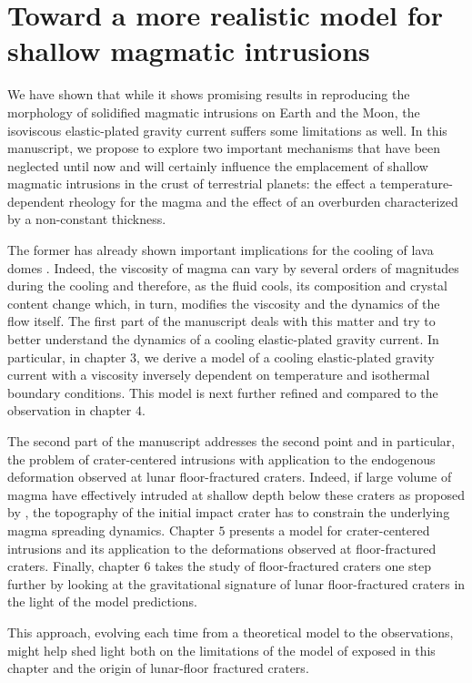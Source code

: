 \section{Toward   a  more   realistic  model   for  shallow   magmatic
  intrusions}
\label{C2-sec:discussion}

We have shown that while it shows promising results in reproducing the
morphology of  solidified magmatic intrusions  on Earth and  the Moon,
the isoviscous elastic-plated gravity current suffers some limitations
as  well.  In  this manuscript,  we propose  to explore  two important
mechanisms  that have  been  neglected until  now  and will  certainly
influence the emplacement of shallow  magmatic intrusions in the crust
of terrestrial  planets: the  effect a  temperature-dependent rheology
for  the magma  and the  effect of  an overburden  characterized by  a
non-constant thickness.

The former has already shown important implications for the cooling of
lava                                                             domes
\citep{Bercovici:2007vc,Bercovici:1996uu,BALMFORTH:1999ey,Garel:2014era}. Indeed,
the viscosity of magma can vary by several orders of magnitudes during
the  cooling \citep{Anonymous:CZVBrBvv,Lejeune:1995fc}  and therefore,
as the fluid cools, its  composition and crystal content change which,
in  turn,  modifies  the  viscosity  and  the  dynamics  of  the  flow
itself. The  first part of the  manuscript deals with this  matter and
try  to better  understand the  dynamics of  a cooling  elastic-plated
gravity current.  In particular, in chapter  $3$, we derive a model of
a cooling  elastic-plated gravity  current with a  viscosity inversely
dependent  on temperature  and isothermal  boundary conditions.   This
model  is next  further refined  and  compared to  the observation  in
chapter $4$.

The second  part of the manuscript  addresses the second point  and in
particular, the problem of crater-centered intrusions with application
to  the  endogenous  deformation  observed  at  lunar  floor-fractured
craters.  Indeed, if  large volume of magma  have effectively intruded
at   shallow    depth   below    these   craters   as    proposed   by
\citet{Schultz:1976kt}, the  topography of  the initial  impact crater
has to constrain the underlying  magma spreading dynamics. Chapter $5$
presents a model for crater-centered intrusions and its application to
the  deformations  observed   at  floor-fractured  craters.   Finally,
chapter  $6$  takes the  study  of  floor-fractured craters  one  step
further   by  looking   at  the   gravitational  signature   of  lunar
floor-fractured craters in the light of the model predictions.

This  approach, evolving  each time  from a  theoretical model  to the
observations, might  help shed  light both on  the limitations  of the
model of \citet{Michaut:2011kg} exposed in this chapter and the origin
of lunar-floor fractured craters.

\newpage





